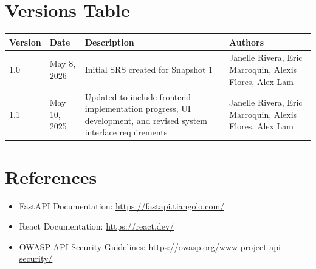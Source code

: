 \documentclass[12pt]{article}
\begin{document}
\section{Versions Table}

\begin{longtable}{|p{1.5cm}|p{2.5cm}|p{5.5cm}|p{4cm}|}
\hline
\textbf{Version} & \textbf{Date} & \textbf{Description} & \textbf{Authors} \\
\hline
1.0 & May 8, 2026 & Initial SRS created for Snapshot 1 & Janelle Rivera, Eric Marroquin, Alexis Flores, Alex Lam \\
\hline
1.1 & May 10, 2025 & Updated to include frontend implementation progress, UI development, and revised system interface requirements & Janelle Rivera, Eric Marroquin, Alexis Flores, Alex Lam \\
\hline
\end{longtable}

\section{References}

\begin{itemize}
    \item FastAPI Documentation: \url{https://fastapi.tiangolo.com/}
    \item React Documentation: \url{https://react.dev/}
    \item OWASP API Security Guidelines: \url{https://owasp.org/www-project-api-security/}
\end{itemize}
\end{document}
